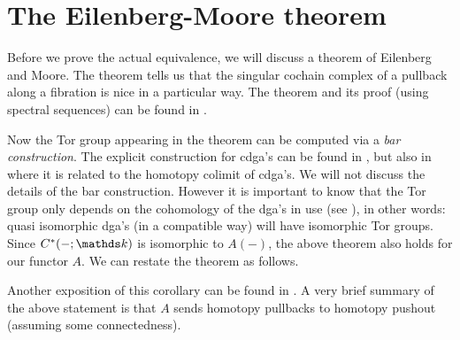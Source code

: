 


\section{The Eilenberg-Moore theorem}
Before we prove the actual equivalence, we will discuss a theorem of Eilenberg and Moore. The theorem tells us that the singular cochain complex of a pullback along a fibration is nice in a particular way. The theorem and its proof (using spectral sequences) can be found in \cite[Theorem 7.14]{mccleary}.


Now the Tor group appearing in the theorem can be computed via a \emph{bar construction}. The explicit construction for cdga's can be found in \cite{bousfield}, but also in \cite{olsson} where it is related to the homotopy colimit of cdga's. We will not discuss the details of the bar construction. However it is important to know that the Tor group only depends on the cohomology of the dga's in use (see \cite[Corollary 7.7]{mccleary}), in other words: quasi isomorphic dga's (in a compatible way) will have isomorphic Tor groups. Since $C^\ast(-;\k)$ is isomorphic to $A(-)$, the above theorem also holds for our functor $A$. We can restate the theorem as follows.

Another exposition of this corollary can be found in \cite[Section 8.4]{berglund}. A very brief summary of the above statement is that $A$ sends homotopy pullbacks to homotopy pushout (assuming some connectedness).

